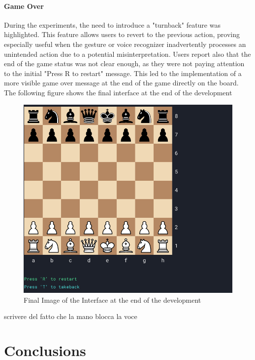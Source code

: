 \documentclass[a4paper, 11pt, twocolumn]{IEEEtran}
\begin{document}
    \paragraph*{Game Over}
    During the experiments, the need to introduce a "turnback" feature was highlighted. This feature allows users to revert to the previous action, proving especially useful when the gesture or voice recognizer inadvertently processes an unintended action due to a potential misinterpretation.
    Users report also that the end of the game status was not clear enough, as they were not paying attention to the initial "Press R to restart" message. This led to the implementation of a more visible game over message at the end of the game directly on the board.
    The following figure shows the final interface at the end of the development
    \begin{figure}
        \centering
        \includegraphics[width=.5\textwidth]{images/interface.png}
        \caption{Final Image of the Interface at the end of the development}
        \label{fig:interface}
    \end{figure} 

    scrivere del fatto che la mano blocca la voce  


    
    \section{Conclusions}
\end{document}
